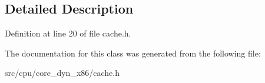 

\subsection{Detailed Description}


Definition at line 20 of file cache.\-h.



The documentation for this class was generated from the following file\-:\begin{DoxyCompactItemize}
\item 
src/cpu/core\-\_\-dyn\-\_\-x86/cache.\-h\end{DoxyCompactItemize}
